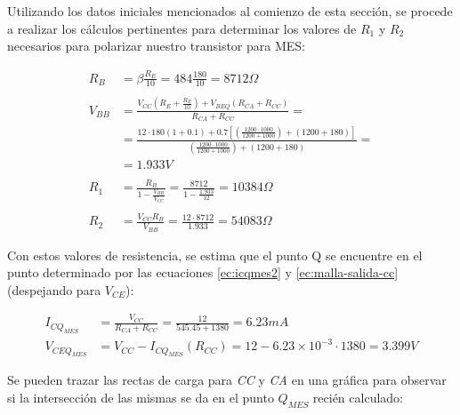 Utilizando los datos iniciales mencionados al comienzo de esta sección, se procede
a realizar los cálculos pertinentes para determinar los valores de $R_1$ y $R_2$ necesarios
para polarizar nuestro transistor para MES:

\begin{align*}
    R_B &= \beta \frac{R_E}{10} = 484\frac{180}{10} = \boxed{8712\Omega}\\ \\
    V_{BB} &= \frac{V_{CC}(R_E +\frac{R_E}{10}) + V_{BEQ}(R_{CA}+R_{CC})}{R_{CA}+R_{CC}} = \\
    &= \frac{12 \cdot 180(1+0.1) + 0.7[(\frac{1200\cdot1000}{1200+1000})+(1200+180)]}{(\frac{1200\cdot1000}{1200+1000})+(1200+180)} = \\
    &= \boxed{1.933V}\\ \\
    R_1 &= \frac{R_B}{1-\frac{V_{BB}}{V_{CC}}} = \frac{8712}{1-\frac{1.933}{12}} = \boxed{10384\Omega}\\ \\
    R_2 &= \frac{V_{CC}R_B}{V_{BB}} = \frac{12\cdot8712}{1.933} = \boxed{54083\Omega}
\end{align*}

Con estos valores de resistencia, se estima que el punto Q se encuentre en el punto
determinado por las ecuaciones \ref{ec:icqmes2} y \ref{ec:malla-salida-cc} (despejando
para $V_{CE}$):

\begin{align*}
    I_{CQ_{MES}} &= \frac{V_{CC}}{R_{CA} + R_{CC}} = \frac{12}{545.45+1380} = \boxed{6.23mA}\\
    V_{CEQ_{MES}} &= V_{CC} - I_{CQ_{MES}}(R_{CC}) = 12-6.23\times10^{-3} \cdot 1380 = \boxed{3.399V}
\end{align*}

Se pueden trazar las rectas de carga para \emph{CC} y \emph{CA} en una gráfica para
observar si la intersección de las mismas se da en el punto $Q_{MES}$ recién calculado:

\begin{figure}[!ht]
  \centering
  \begin{minipage}{0.45\textwidth}
  \end{minipage}
\end{figure}

